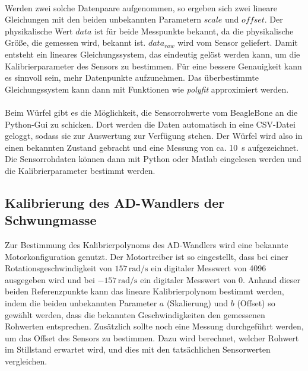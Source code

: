         \\
        Werden zwei solche Datenpaare aufgenommen, so ergeben sich zwei lineare Gleichungen mit den beiden unbekannten Parametern $scale$ und $offset$. Der physikalische Wert $data$ ist für beide Messpunkte bekannt, da die physikalische Größe, die gemessen wird, bekannt ist. $data_{raw}$ wird vom Sensor geliefert. Damit entsteht ein lineares Gleichungssystem, das eindeutig gelöst werden kann, um die Kalibrierparameter des Sensors zu bestimmen. Für eine bessere Genauigkeit kann es sinnvoll sein, mehr Datenpunkte aufzunehmen. Das überbestimmte Gleichungssystem kann dann mit Funktionen wie \textit{polyfit} approximiert werden.\\
        \\
        Beim Würfel gibt es die Möglichkeit, die Sensorrohwerte vom BeagleBone an die Python-Gui zu schicken. Dort werden die Daten automatisch in eine CSV-Datei geloggt, sodass sie zur Auswertung zur Verfügung stehen. Der Würfel wird also in einen bekannten Zustand gebracht und eine Messung von ca. \SI{10}{\second} aufgezeichnet. Die Sensorrohdaten können dann mit Python oder Matlab eingelesen werden und die Kalibrierparameter bestimmt werden.

        \subsection{Kalibrierung des AD-Wandlers der Schwungmasse}
            Zur Bestimmung des Kalibrierpolynoms des AD-Wandlers wird eine bekannte Motorkonfiguration genutzt. Der Motortreiber ist so eingestellt, dass bei einer Rotationsgeschwindigkeit von $157\,\mathrm{rad/s}$ ein digitaler Messwert von 4096 ausgegeben wird und bei $-157\,\mathrm{rad/s}$ ein digitaler Messwert von 0.   Anhand dieser beiden Referenzpunkte kann das lineare Kalibrierpolynom bestimmt werden, indem die beiden unbekannten Parameter $a$ (Skalierung) und $b$ (Offset) so gewählt werden, dass die bekannten Geschwindigkeiten den gemessenen Rohwerten entsprechen. Zusätzlich sollte noch eine Messung durchgeführt werden, um das Offset des Sensors zu bestimmen. Dazu wird berechnet, welcher Rohwert im Stillstand erwartet wird, und dies mit den tatsächlichen Sensorwerten vergleichen.

